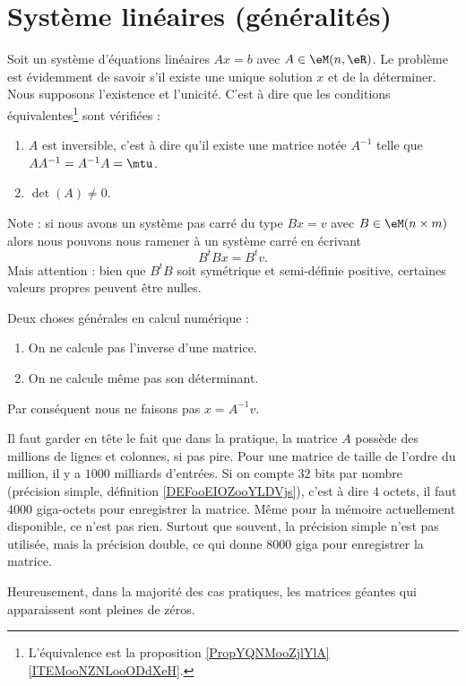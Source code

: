 

\section{Système linéaires (généralités)}

Soit un système d'équations linéaires \( Ax=b\) avec \( A\in \eM(n,\eR)\). Le problème est évidemment de savoir s'il existe une unique solution \( x\) et de la déterminer. Nous supposons l'existence et l'unicité. C'est à dire que les conditions équivalentes\footnote{L'équivalence est la proposition \ref{PropYQNMooZjlYlA}\ref{ITEMooNZNLooODdXeH}.} sont vérifiées :
\begin{enumerate}
    \item
        \( A\) est inversible, c'est à dire qu'il existe une matrice notée \( A^{-1}\) telle que \( AA^{-1}=A^{-1}A=\mtu\).
    \item
        \( \det(A)\neq 0\).
\end{enumerate}
Note : si  nous avons un système pas carré du type \( Bx=v\) avec \( B\in \eM(n\times m)\) alors nous pouvons nous ramener à un système carré en écrivant
\begin{equation}
    B^tBx=B^tv.
\end{equation}
Mais attention : bien que \( B^tB\) soit symétrique et semi-définie positive, certaines valeurs propres peuvent être nulles.

\begin{normaltext}
    Deux choses générales en calcul numérique :
    \begin{enumerate}
        \item
            On ne calcule pas l'inverse d'une matrice.
        \item
            On ne calcule même pas son déterminant.
    \end{enumerate}
    Par conséquent nous ne faisons pas \( x=A^{-1}v\).

    Il faut garder en tête le fait que dans la pratique, la matrice \( A\) possède des millions de lignes et colonnes, si pas pire. Pour une matrice de taille de l'ordre du million, il y a \( 1000\) milliards d'entrées. Si on compte \( 32\) bits par nombre (précision simple, définition \ref{DEFooEIOZooYLDVjs}), c'est à dire \( 4\) octets, il faut \( 4000\) giga-octets pour enregistrer la matrice. Même pour la mémoire actuellement disponible, ce n'est pas rien. Surtout que souvent, la précision simple n'est pas utilisée, mais la précision double, ce qui donne \( 8000\) giga pour enregistrer la matrice.

    Heureusement, dans la majorité des cas pratiques, les matrices géantes qui apparaissent sont pleines de zéros.

\end{normaltext}

